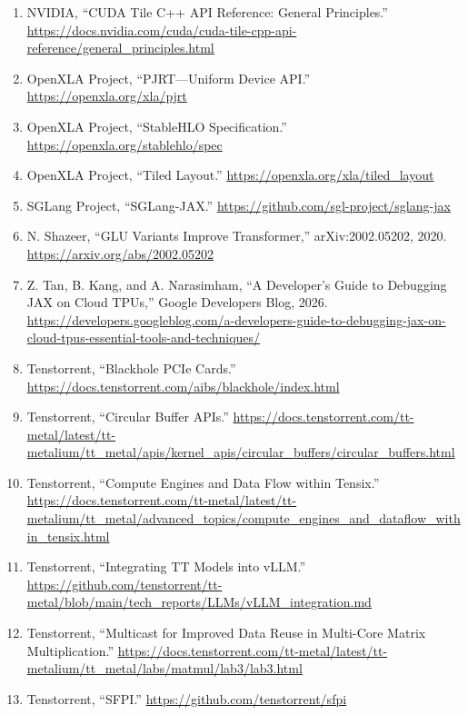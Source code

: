 \documentclass[
  10pt,
  american,
  10pt,
  letterpaper]{article}
\providecommand{\tightlist}{%
  \setlength{\itemsep}{0pt}\setlength{\parskip}{0pt}}
\begin{document}
\begin{enumerate}
  \begin{enumerate}
  \def\labelenumii{\arabic{enumii}.}
  \setcounter{enumii}{2020}
  \tightlist
  \item
    \url{https://doi.org/10.1109/CGO51591.2021.9370308}
  \end{enumerate}
\item
  NVIDIA, ``CUDA Tile C++ API Reference: General Principles.''
  \url{https://docs.nvidia.com/cuda/cuda-tile-cpp-api-reference/general_principles.html}
\item
  OpenXLA Project, ``PJRT---Uniform Device API.''
  \url{https://openxla.org/xla/pjrt}
\item
  OpenXLA Project, ``StableHLO Specification.''
  \url{https://openxla.org/stablehlo/spec}
\item
  OpenXLA Project, ``Tiled Layout.''
  \url{https://openxla.org/xla/tiled_layout}
\item
  SGLang Project, ``SGLang-JAX.''
  \url{https://github.com/sgl-project/sglang-jax}
\item
  N. Shazeer, ``GLU Variants Improve Transformer,'' arXiv:2002.05202,
  2020. \url{https://arxiv.org/abs/2002.05202}
\item
  Z. Tan, B. Kang, and A. Narasimham, ``A Developer's Guide to Debugging
  JAX on Cloud TPUs,'' Google Developers Blog, 2026.
  \url{https://developers.googleblog.com/a-developers-guide-to-debugging-jax-on-cloud-tpus-essential-tools-and-techniques/}
\item
  Tenstorrent, ``Blackhole PCIe Cards.''
  \url{https://docs.tenstorrent.com/aibs/blackhole/index.html}
\item
  Tenstorrent, ``Circular Buffer APIs.''
  \url{https://docs.tenstorrent.com/tt-metal/latest/tt-metalium/tt_metal/apis/kernel_apis/circular_buffers/circular_buffers.html}
\item
  Tenstorrent, ``Compute Engines and Data Flow within Tensix.''
  \url{https://docs.tenstorrent.com/tt-metal/latest/tt-metalium/tt_metal/advanced_topics/compute_engines_and_dataflow_within_tensix.html}
\item
  Tenstorrent, ``Integrating TT Models into vLLM.''
  \url{https://github.com/tenstorrent/tt-metal/blob/main/tech_reports/LLMs/vLLM_integration.md}
\item
  Tenstorrent, ``Multicast for Improved Data Reuse in Multi-Core Matrix
  Multiplication.''
  \url{https://docs.tenstorrent.com/tt-metal/latest/tt-metalium/tt_metal/labs/matmul/lab3/lab3.html}
\item
  Tenstorrent, ``SFPI.'' \url{https://github.com/tenstorrent/sfpi}

\end{enumerate}
\end{document}

